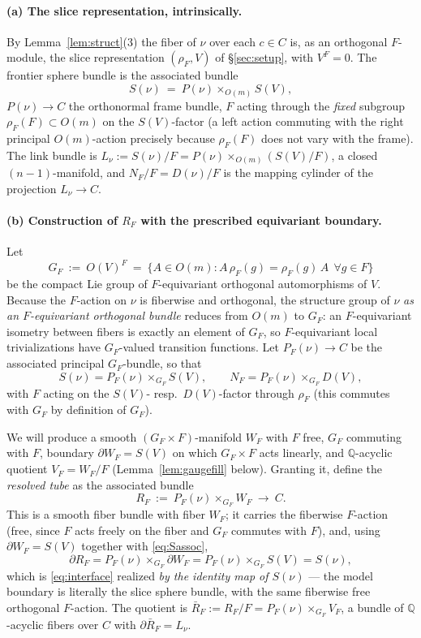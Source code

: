 \documentclass[12pt]{article}
\theoremstyle{definition}
\begin{document}
\paragraph{(a) The slice representation, intrinsically.}
By Lemma~\ref{lem:struct}(3) the fiber of $\nu$ over each $c\in C$ is, as an
orthogonal $F$-module, the slice representation $(\rho_F,V)$ of \S\ref{sec:setup},
with $V^F=0$. The frontier sphere bundle is the associated bundle
\[
   S(\nu)\ =\ P(\nu)\times_{O(m)}S(V),
\]
$P(\nu)\to C$ the orthonormal frame bundle, $F$ acting through the \emph{fixed}
subgroup $\rho_F(F)\subset O(m)$ on the $S(V)$-factor (a left action commuting
with the right principal $O(m)$-action precisely because $\rho_F(F)$ does not vary
with the frame). The link bundle is $L_\nu:=S(\nu)/F=P(\nu)\times_{O(m)}(S(V)/F)$,
a closed $(n-1)$-manifold, and $N_F/F=D(\nu)/F$ is the mapping cylinder of the
projection $L_\nu\to C$.

\paragraph{(b) Construction of $R_F$ with the prescribed equivariant boundary.}
Let
\[
   G_F\ :=\ O(V)^F\ =\ \{A\in O(m):A\,\rho_F(g)=\rho_F(g)\,A\ \ \forall g\in F\}
\]
be the compact Lie group of $F$-equivariant orthogonal automorphisms of $V$.
Because the $F$-action on $\nu$ is fiberwise and orthogonal, the structure group
of $\nu$ \emph{as an $F$-equivariant orthogonal bundle} reduces from $O(m)$ to
$G_F$: an $F$-equivariant isometry between fibers is exactly an element of $G_F$,
so $F$-equivariant local trivializations have $G_F$-valued transition functions.
Let $P_F(\nu)\to C$ be the associated principal $G_F$-bundle, so that
\begin{equation}\label{eq:Sassoc}
   S(\nu)=P_F(\nu)\times_{G_F}S(V),\qquad
   N_F=P_F(\nu)\times_{G_F}D(V),
\end{equation}
with $F$ acting on the $S(V)$- resp.\ $D(V)$-factor through $\rho_F$ (this commutes
with $G_F$ by definition of $G_F$).

We will produce a smooth $(G_F\times F)$-manifold $W_F$ with $F$ free, $G_F$
commuting with $F$, boundary $\partial W_F=S(V)$ on which $G_F\times F$ acts
linearly, and $\mathbb{Q}$-acyclic quotient $V_F=W_F/F$ (Lemma~\ref{lem:gaugefill}
below). Granting it, define the \emph{resolved tube} as the associated bundle
\begin{equation}\label{eq:RFdef}
   R_F\ :=\ P_F(\nu)\times_{G_F}W_F\ \longrightarrow\ C .
\end{equation}
This is a smooth fiber bundle with fiber $W_F$; it carries the fiberwise
$F$-action (free, since $F$ acts freely on the fiber and $G_F$ commutes with $F$),
and, using $\partial W_F=S(V)$ together with \eqref{eq:Sassoc},
\[
   \partial R_F=P_F(\nu)\times_{G_F}\partial W_F
              =P_F(\nu)\times_{G_F}S(V)=S(\nu),
\]
which is \eqref{eq:interface} realized \emph{by the identity map of $S(\nu)$} ---
the model boundary is literally the slice sphere bundle, with the same fiberwise
free orthogonal $F$-action. The quotient is $\bar R_F:=R_F/F=
P_F(\nu)\times_{G_F}V_F$, a bundle of $\mathbb{Q}$-acyclic fibers over $C$ with
$\partial\bar R_F=L_\nu$.
\end{document}
